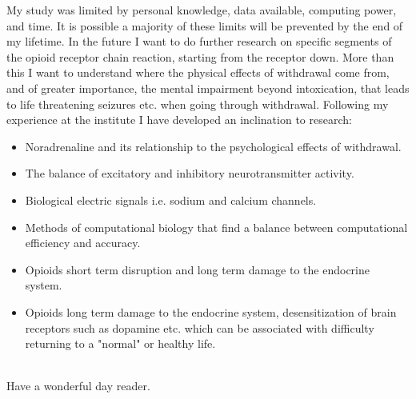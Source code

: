 \documentclass[a4paper,10pt]{article}
\begin{document}
My study was limited by personal knowledge, data available, computing power, and time. It is possible a majority of these limits will be prevented by the end of my lifetime. In the future I want to do further research on specific segments of the opioid receptor chain reaction, starting from the receptor down. More than this I want to understand where the physical effects of withdrawal come from, and of greater importance, the mental impairment beyond intoxication, that leads to life threatening seizures etc. when going through withdrawal. 
Following my experience at the institute I have developed an inclination to research:
\begin{itemize}
    \item Noradrenaline and its relationship to the psychological effects of withdrawal.
    \item The balance of excitatory and inhibitory neurotransmitter activity.
    \item Biological electric signals i.e. sodium and calcium channels.
    \item Methods of computational biology that find a balance between computational efficiency and accuracy.
    \item Opioids short term disruption and long term damage to the endocrine system.
    \item Opioids long term damage to the endocrine system, desensitization of brain receptors such as dopamine etc. which can be associated with difficulty returning to a "normal" or healthy life. \\
\end{itemize}
\\
Have a wonderful day reader.



\cite{nida_overdose_2024}
\cite{cdc_health_statistics_2024}
\end{document}
